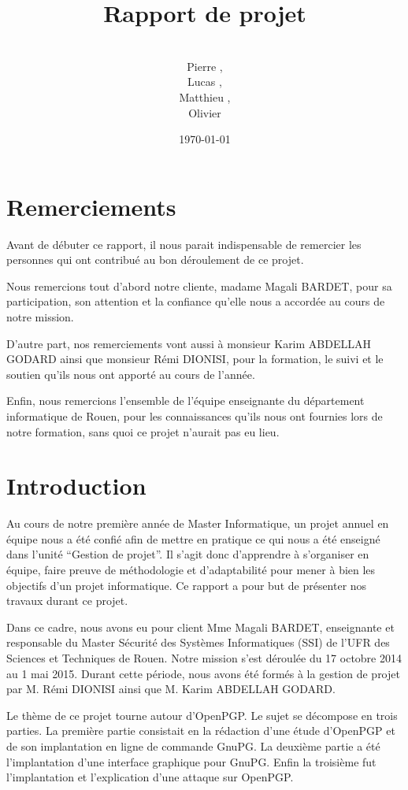 \documentclass{../res/univ-projet}
\title{Rapport de projet}
\author{\\ Pierre \bsc{Balmelle},\\ Lucas \bsc{Barbay}, \\ Matthieu \bsc{Fin},
\\ Olivier \bsc{Thibault}}
\date{\today}
\begin{document}
\maketitle
\newpage
\thispagestyle{empty}
\setcounter{page}{0}
\section*{Remerciements}
Avant de débuter ce rapport, il nous parait indispensable de remercier les 
personnes qui ont contribué au bon déroulement de ce projet.

Nous remercions tout d'abord notre cliente, madame Magali BARDET, pour sa 
participation, son attention et la confiance qu'elle nous a accordée au 
cours de notre mission.

D'autre part, nos remerciements vont aussi à monsieur Karim ABDELLAH 
GODARD ainsi que monsieur Rémi DIONISI, pour la formation, le suivi 
et le soutien qu'ils nous ont apporté au cours de l'année.

Enfin, nous remercions l'ensemble de l'équipe enseignante du département 
informatique de Rouen, pour les connaissances qu'ils nous ont fournies lors 
de notre formation, sans quoi ce projet n'aurait pas eu lieu.
\newpage
\setcounter{page}{0}
\tableofcontents

\newpage

\section{Introduction}

Au cours de notre première année de Master Informatique, un projet annuel 
en équipe nous a été confié afin de mettre en pratique ce qui nous a 
été enseigné dans l'unité ``Gestion de projet''. Il s'agit donc d'apprendre 
à s'organiser en équipe, faire preuve de méthodologie et d'adaptabilité 
pour mener à bien les objectifs d'un projet informatique. Ce rapport a pour 
but de présenter nos travaux durant ce projet.

Dans ce cadre, nous avons eu pour client Mme Magali BARDET, enseignante et 
responsable du Master Sécurité des Systèmes Informatiques (SSI) de l'UFR des 
Sciences et Techniques de Rouen. Notre mission s'est déroulée du 17 octobre 
2014 au 1 mai 2015. Durant cette période, nous avons été formés à la 
gestion de projet par M. Rémi DIONISI ainsi que M. Karim ABDELLAH GODARD.

Le thème de ce projet tourne autour d'OpenPGP. Le sujet se décompose en trois 
parties. La première partie consistait en la rédaction d'une étude d'OpenPGP 
et de son implantation en ligne de commande GnuPG. La deuxième partie a été 
l'implantation d'une interface graphique pour GnuPG. Enfin la troisième fut 
l'implantation et l'explication d'une attaque sur OpenPGP.
\end{document}
